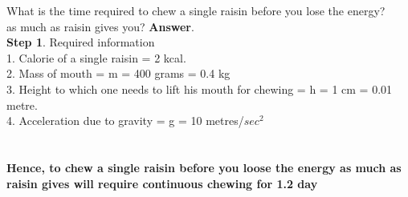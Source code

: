 \documentclass[11pt]{exam}
\begin{document}
\begin{questions}
\question
\label{Q18:Calories required to chew a raisin}
What is the time required to chew a single raisin before you lose the energy? \\ as much as raisin gives you?
\textbf{Answer}. \\
\textbf{Step 1}. Required information \\
                 1. Calorie of a single raisin =  2 kcal. \\
                 2. Mass of mouth = m = 400 grams = 0.4 kg   \\    
                 3. Height to which one needs to lift his mouth for chewing = h =  1 cm = 0.01 metre.   \\
                 4. Acceleration due to gravity = g = 10 metres/$sec^{2}$    
\\
 \\ \\
                 \textbf{Hence, to chew a single raisin before you loose the energy as much as raisin gives will require continuous chewing for 1.2 day} \\ \\ 



\end{questions}
\end{document}
